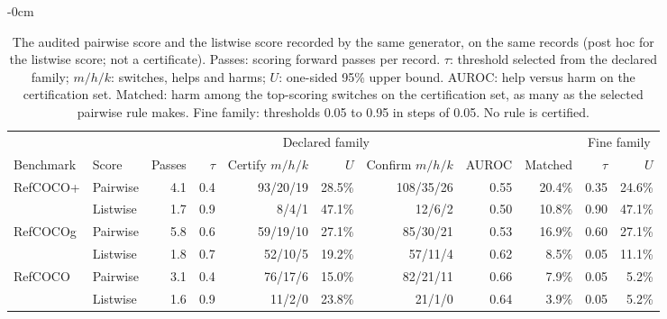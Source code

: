 \begin{table}[H]
\begin{adjustwidth}{-\extralength}{0cm}
\caption{The audited pairwise score and the listwise score recorded by the same
generator, on the same records (post hoc for the listwise score; not a
certificate).  Passes: scoring forward passes per record.  $\tau$: threshold
selected from the declared family; $m/h/k$: switches, helps and harms;
$U$: one-sided 95\% upper bound.  AUROC: help versus harm on the certification
set.  Matched: harm among the top-scoring switches on the certification set, as
many as the selected pairwise rule makes.  Fine family: thresholds 0.05 to 0.95
in steps of 0.05.  No rule is certified.\label{tab:listwise}}
\centering
\small
\setlength{\tabcolsep}{4pt}
\begin{tabular}{@{}llrrrrrrrrr@{}}
\toprule
& & & \multicolumn{4}{c}{Declared family} & & & \multicolumn{2}{c}{Fine family} \\
\cmidrule(lr){4-7}\cmidrule(l){10-11}
Benchmark & Score & Passes & $\tau$ & Certify $m/h/k$ & $U$ & Confirm $m/h/k$ & AUROC & Matched & $\tau$ & $U$ \\
\midrule
RefCOCO+ & Pairwise & 4.1 & 0.4 & 93/20/19 & 28.5\% & 108/35/26 & 0.55 & 20.4\% & 0.35 & 24.6\% \\
 & Listwise & 1.7 & 0.9 & 8/4/1 & 47.1\% & 12/6/2 & 0.50 & 10.8\% & 0.90 & 47.1\% \\
\midrule
RefCOCOg & Pairwise & 5.8 & 0.6 & 59/19/10 & 27.1\% & 85/30/21 & 0.53 & 16.9\% & 0.60 & 27.1\% \\
 & Listwise & 1.8 & 0.7 & 52/10/5 & 19.2\% & 57/11/4 & 0.62 & 8.5\% & 0.05 & 11.1\% \\
\midrule
RefCOCO & Pairwise & 3.1 & 0.4 & 76/17/6 & 15.0\% & 82/21/11 & 0.66 & 7.9\% & 0.05 & 5.2\% \\
 & Listwise & 1.6 & 0.9 & 11/2/0 & 23.8\% & 21/1/0 & 0.64 & 3.9\% & 0.05 & 5.2\% \\
\bottomrule
\end{tabular}
\end{adjustwidth}
\end{table}
